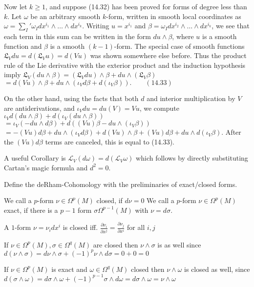 Now let \(k \geq 1\), and suppose (14.32) has been proved for forms of degree less 
than \(k\). Let \(\omega\) be an arbitrary smooth \(k\)-form, written in smooth local coordinates as
\(\omega = \sum_I' \omega_I dx^{i_1} \wedge \dots \wedge dx^{i_k}.\)
Writing \(u = x^{i_1}\) and \(\beta = \omega_I dx^{i_2} \wedge \dots \wedge dx^{i_k}\), we see that each term in this sum 
can be written in the form \(du \wedge \beta\), where \(u\) is a smooth function and \(\beta\) is a
smooth \((k-1)\)-form. The special case of smooth functions \(\mathfrak{L}_V du = d(\mathfrak{L}_V u) = d(Vu)\) was shown somewhere else before. 
Thus the product rule of the Lie derivative with the exterior product and the induction hypothesis imply
\(\mathfrak{L}_V (du \wedge \beta) = (\mathfrak{L}_V du) \wedge \beta + du \wedge (\mathfrak{L}_V \beta) \)
\(= d(Vu) \wedge \beta + du \wedge (\iota_V d\beta + d(\iota_V \beta)). \qquad (14.33) \)

On the other hand, using the facts that both \(d\) and interior multiplication by \(V\) are
antiderivations, and \(\iota_V du = du(V) = Vu\), we compute
\(\iota_V d(du \wedge \beta) + d(\iota_V (du \wedge \beta))\)
\(= \iota_V (-du \wedge d\beta) + d((Vu)\beta - du \wedge (\iota_V \beta))\)
\(= -(Vu)d\beta + du \wedge (\iota_V d\beta) + d(Vu) \wedge \beta + (Vu)d\beta + du \wedge d(\iota_V \beta).\)
After the \((Vu)d\beta\) terms are canceled, this is equal to (14.33). \qquad \square

A useful Corollary is \( \mathcal{L}_V(d\omega) = d(\mathcal{L}_V \omega) \)
which follows by directly substituting Cartan's magic formula and \( d^2 = 0 \).


Define the deRham-Cohomology with the preliminaries of exact/closed forms.

We call a \( p \)-form \( \nu \in \Omega^p(M) \) closed, if
\( d\nu = 0 \)
We call a \( p \)-form \( \nu \in \Omega^p(M) \) exact, if
there is a \( p-1 \) form \( \sigma \Omega^{p-1}(M) \) with
\( \nu = d\sigma \).


A \( 1 \)-form \( \nu = \nu_i dx^i \) is closed iff. 
\( \frac{\partial \nu_i}{\partial x^j} = \frac{\partial \nu_j}{\partial x^i} \)
for all \( i,j \)

If \( \nu \in \Omega^p(M), \sigma \in \Omega^q(M) \) are closed then \( \nu \wedge \sigma \)
is as well since
\( d(\nu \wedge \sigma) = d\nu \wedge \sigma + (-1)^p \nu \wedge d\sigma = 0 + 0 = 0 \)

If \( \nu \in \Omega^p(M) \) is exact and \( \omega \in \Omega^q(M) \) closed
then \( \nu \wedge \omega \) is closed as well, since
\( d(\sigma \wedge \omega) = d\sigma \wedge \omega + (-1)^{p-1}\sigma \wedge d\omega = d\sigma \wedge \omega = \nu \wedge \omega \)

